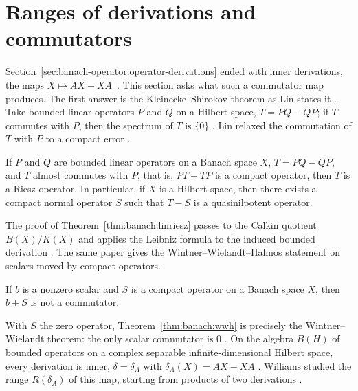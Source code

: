 \section{Ranges of derivations and commutators}\label{sec:banach-operator:commutator-ranges}

Section~\ref{sec:banach-operator:operator-derivations} ended with inner
derivations, the maps $X\mapsto AX-XA$~\cite[Theorem~1, p.~529]{LinCS1971Kleinecke}. This section asks what such a
commutator map produces. The first answer is the Kleinecke--Shirokov
theorem as Lin states it \cite[p.~529]{LinCS1971Kleinecke}. Take bounded
linear operators $P$ and $Q$ on a Hilbert space, $T=PQ-QP$; if $T$ commutes
with $P$, then the spectrum of $T$ is $\{0\}$
\cite[p.~529]{LinCS1971Kleinecke}. Lin relaxed the commutation of $T$
with $P$ to a compact error \cite[Theorem~1, p.~529]{LinCS1971Kleinecke}.

\begin{theorem}\label{thm:banach:linriesz}
If $P$ and $Q$ are bounded linear operators on a Banach space $X$,
$T=PQ-QP$, and $T$ almost commutes with $P$, that is, $PT-TP$ is a compact
operator, then $T$ is a Riesz operator. In particular, if $X$ is a Hilbert
space, then there exists a compact normal operator $S$ such that $T-S$ is
a quasinilpotent operator.
\end{theorem}

The proof of Theorem~\ref{thm:banach:linriesz} passes to the Calkin
quotient $B(X)/K(X)$ and applies the Leibniz formula to the induced
bounded derivation \cite[p.~529]{LinCS1971Kleinecke}. The same paper gives
the Wintner--Wielandt--Halmos statement on scalars moved by compact
operators.

\begin{theorem}\label{thm:banach:wwh}
If $b$ is a nonzero scalar and $S$ is a compact operator on a Banach space
$X$, then $b+S$ is not a commutator.
\end{theorem}

With $S$ the zero operator, Theorem~\ref{thm:banach:wwh} is precisely the
Wintner--Wielandt theorem: the only scalar commutator is $0$
\cite[p.~530]{LinCS1971Kleinecke}. On the algebra $B(H)$ of bounded
operators on a complex separable infinite-dimensional Hilbert space, every
derivation is inner, $\delta=\delta_A$ with $\delta_A(X)=AX-XA$
\cite[p.~273]{WilliamsJP1971Range}. Williams studied the range
$R(\delta_A)$ of this map, starting from products of two derivations
\cite[Theorem~1, pp.~273--274]{WilliamsJP1971Range}.

